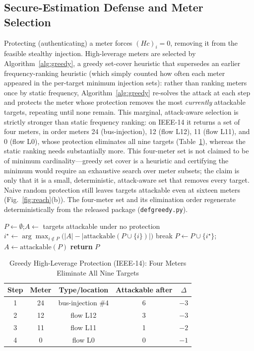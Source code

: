 \documentclass{ieeeaccess}
\begin{document}
\subsection{Secure-Estimation Defense and Meter Selection}
Protecting (authenticating) a meter forces $(Hc)_i=0$, removing it from the feasible stealthy injection. High-leverage meters are selected by Algorithm~\ref{alg:greedy}, a greedy set-cover heuristic that supersedes an earlier frequency-ranking heuristic (which simply counted how often each meter appeared in the per-target minimum injection sets): rather than ranking meters once by static frequency, Algorithm~\ref{alg:greedy} re-solves the attack at each step and protects the meter whose protection removes the most \emph{currently} attackable targets, repeating until none remain. This marginal, attack-aware selection is strictly stronger than static frequency ranking: on IEEE-14 it returns a set of four meters, in order meters 24 (bus-injection), 12 (flow L12), 11 (flow L11), and 0 (flow L0), whose protection eliminates all nine targets (Table~\ref{tab:def}), whereas the static ranking needs substantially more. This four-meter set is not claimed to be of minimum cardinality---greedy set cover is a heuristic and certifying the minimum would require an exhaustive search over meter subsets; the claim is only that it is a small, deterministic, attack-aware set that removes every target. Naive random protection still leaves targets attackable even at sixteen meters (Fig.~\ref{fig:reach}(b)). The four-meter set and its elimination order regenerate deterministically from the released package (\texttt{defgreedy.py}).
\begin{algorithm}[!t]
\caption{Greedy high-leverage meter selection}\label{alg:greedy}
\begin{algorithmic}[1]
\STATE $P \gets \emptyset$;\quad $A \gets$ targets attackable under no protection
\STATE $i^\star \gets \arg\max_{i \notin P}\big(|A| - |\mathrm{attackable}(P\cup\{i\})|\big)$
 \STATE break \ENDIF
\STATE $P \gets P \cup \{i^\star\}$;\quad $A \gets \mathrm{attackable}(P)$
\ENDWHILE
\STATE \textbf{return} $P$
\end{algorithmic}
\end{algorithm}
\begin{table}[!t]\centering\caption{Greedy High-Leverage Protection (IEEE-14): Four Meters Eliminate All Nine Targets}\label{tab:def}
\begin{tabular}{ccccc}\toprule Step&Meter&Type/location&Attackable after&$\Delta$\\\midrule
1&24&bus-injection \#4&6&$-3$\\2&12&flow L12&3&$-3$\\3&11&flow L11&1&$-2$\\4&0&flow L0&0&$-1$\\\bottomrule\end{tabular}\end{table}
\end{document}
